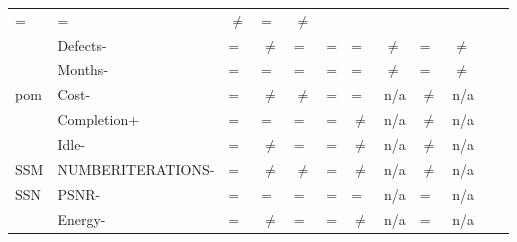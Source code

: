 \begin{tabular}{llllllllllll}
                                = & = & $\neq$ & 
                                = & $\neq$ & 
                                \\
              & Defects-      & = & $\neq$ & = & 
                                = & = & $\neq$ & 
                                = & $\neq$ & 
                                \\
              & Months-       & = & = & = & 
                                = & = & $\neq$ & 
                                = & $\neq$ & 
                                \\
  \hline
  pom   & Cost-             & = & $\neq$ & $\neq$ & 
                              = & = & n/a & 
                              $\neq$ & n/a & 
                               \\
        & Completion+       & = & = & = & 
                              = & $\neq$ & n/a & 
                              $\neq$ & n/a & 
                               \\
        & Idle-             & = & $\neq$ & = & 
                              = & $\neq$ & n/a & 
                              $\neq$ & n/a & 
                              \\
  \hline
  SSM  & NUMBERITERATIONS- &  = & $\neq$ & $\neq$ & 
                              = & $\neq$ & n/a & 
                              $\neq$ & n/a & 
                              \\
  \hline
  SSN     & PSNR-       & = & = & = & 
                          = & = & n/a & 
                          = & n/a & 
                          \\
          & Energy-     & = & $\neq$ & = &
                          = & $\neq$ & n/a & 
                          = & n/a & 
                          \\      
  \end{tabular}
